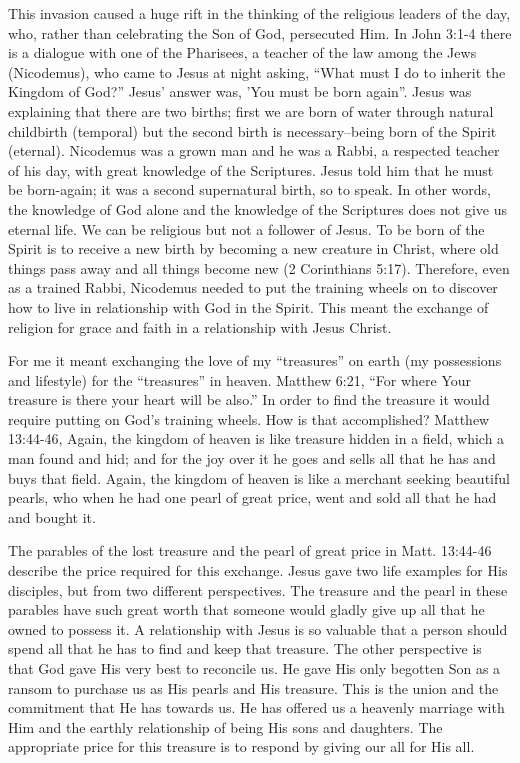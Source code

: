 \documentclass[oneside]{book}
\begin{document}
This invasion caused a huge rift in the thinking of the religious leaders of the day, who, rather than celebrating the Son of God, persecuted Him. In John 3:1-4 there is a dialogue with one of the Pharisees, a teacher of the law among the Jews (Nicodemus), who came to Jesus at night asking, “What must I do to inherit the Kingdom of God?” Jesus' answer was, 'You must be born again”. Jesus was explaining that there are two births; first we are born of water through natural childbirth (temporal) but the second birth is necessary--being born of the Spirit (eternal). Nicodemus was a grown man and he was a Rabbi, a respected teacher of his day, with great knowledge of the Scriptures. Jesus told him that he must be born-again; it was a second supernatural birth, so to speak. In other words, the knowledge of God alone and the knowledge of the Scriptures does not give us eternal life. We can be religious but not a follower of Jesus. To be born of the Spirit is to receive a new birth by becoming a new creature in Christ, where old things pass away and all things become new (2 Corinthians 5:17). Therefore, even as a trained Rabbi, Nicodemus needed to put the training wheels on to discover how to live in relationship with God in the Spirit. This meant the exchange of religion for grace and faith in a relationship with Jesus Christ. 

For me it meant exchanging the love of my “treasures” on earth (my possessions and lifestyle) for the “treasures” in heaven. Matthew 6:21,  “For where Your treasure is there your heart will be also.” In order to find the treasure it would require putting on God’s training wheels. How is that accomplished? Matthew 13:44-46, Again, the kingdom of heaven is like treasure hidden in a field, which a man found and hid; and for the joy over it he goes and sells all that he has and buys that field. Again, the kingdom of heaven is like a merchant seeking beautiful pearls, who when he had one pearl of great price, went and sold all that he had and bought it.

The parables of the lost treasure and the pearl of great price in Matt. 13:44-46 describe the price required for this exchange. Jesus gave two life examples for His disciples, but from two different perspectives. The treasure and the pearl in these parables have such great worth that someone would gladly give up all that he owned to possess it. A relationship with Jesus is so valuable that a person should spend all that he has to find and keep that treasure. The other perspective is that God gave His very best to reconcile us. He gave His only begotten Son as a ransom to purchase us as His pearls and His treasure. This is the union and the commitment that He has towards us. He has offered us a heavenly marriage with Him and the earthly relationship of being His sons and daughters. The appropriate price for this treasure is to respond by giving our all for His all.
\end{document}
